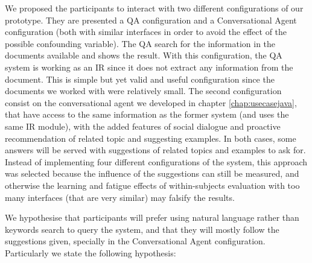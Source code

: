 We proposed the participants to interact with two different configurations of our prototype. They are presented a \ac{QA} configuration and a Conversational Agent configuration (both with similar interfaces in order to avoid the effect of the possible confounding variable). The \ac{QA} search for the information in the documents available and shows the result. With this configuration, the \ac{QA} system is working as an \ac{IR} since it does not extract any information from the document. This is simple but yet valid and useful configuration since the documents we worked with were relatively small. The second configuration consist on the conversational agent we developed in chapter \ref{chap:usecasejava}, that have access to the same information as the former system (and uses the same \ac{IR} module), with the added features of social dialogue and proactive recommendation of related topic and suggesting examples. In both cases, some answers will be served with suggestions of related topics and examples to ask for. Instead of implementing four different configurations of the system, this approach was selected because the influence of the suggestions can still be measured, and otherwise the learning and fatigue effects of within-subjects evaluation with too many interfaces (that are very similar) may falsify the results.

We hypothesise that participants will prefer using natural language rather than keywords search to query the system, and that they will mostly follow the suggestions given, specially in the Conversational Agent configuration. Particularly we state the following hypothesis:

